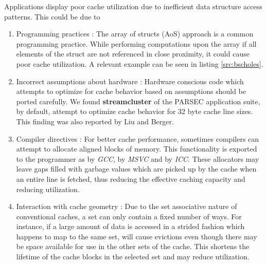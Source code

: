 Applications display poor cache utilization due to inefficient data structure access patterns. This could be due to 
\begin{enumerate}
  \item Programming practices : The array of structs (AoS) approach is a common programming practice. While performing computations upon the array if all elements of the struct are not referenced in close proximity, it could cause poor cache utilization. A relevant example can be seen in listing \ref{src:bscholes}.
  \item Incorrect assumptions about hardware : Hardware conscious code which attempts to optimize for cache behavior based on assumptions should be ported carefully. We found \textbf{streamcluster} of the PARSEC application suite, by default, attempt to optimize cache behavior for 32 byte cache line sizes. This finding was also reported by Liu and Berger\cite{Liu:2011:SPD:2048066.2048070}.
  \item Compiler directives : For better cache performance, sometimes compilers can attempt to allocate aligned blocks of memory. This functionality is exported to the programmer as  by \textit{GCC},  by \textit{MSVC} and  by \textit{ICC}. These allocators may leave gaps filled with garbage values which are picked up by the cache when an entire line is fetched, thus reducing the effective caching capacity and reducing utilization.
  \item Interaction with cache geometry : Due to the set associative nature of conventional caches, a set can only contain a fixed number of ways. For instance, if a large amount of data is accessed in a strided fashion which happens to map to the same set, will cause evictions even though there may be space available for use in the other sets of the cache. This shortens the lifetime of the cache blocks in the selected set and may reduce utilization.
\end{enumerate}

